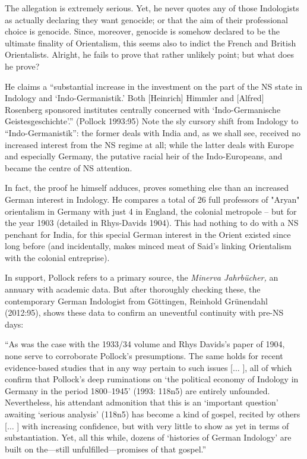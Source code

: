 The allegation is extremely serious. Yet, he never quotes any of those Indologists as actually declaring they want genocide; or that the aim of their professional choice is genocide. Since, moreover, genocide is somehow declared to be the ultimate finality of Orientalism, this seems also to indict the French and British Orientalists. Alright, he fails to prove that rather unlikely point; but what does he prove?

He claims a “substantial increase in the investment on the part of the NS state in Indology and ‘Indo-Germanistik.’ Both [Heinrich] Himmler and [Alfred] Rosenberg sponsored institutes centrally concerned with ‘Indo-Germanische Geistesgeschichte’.” (Pollock 1993:95) Note the sly cursory shift from Indology to “Indo-Germanistik”: the former deals with India and, as we shall see, received no increased interest from the NS regime at all; while the latter deals with Europe and especially Germany, the putative racial heir of the Indo-Europeans, and became the centre of NS attention. 
\newpage

In fact, the proof he himself adduces, proves something else than an increased German interest in Indology. He compares a total of 26 full professors of "Aryan" orientalism in Germany with just 4 in England, the colonial metropole – but for the year 1903 (detailed in Rhys-Davids 1904). This had nothing to do with a NS penchant for India, for this special German interest in the Orient existed since long before (and incidentally, makes minced meat of Said’s linking Orientalism with the colonial entreprise).

In support, Pollock refers to a primary source, the {\sl Minerva Jahrbücher,} an annuary with academic data. But after thoroughly checking these, the contemporary German Indologist from Göttingen, Reinhold Grünendahl (2012:95), shows these data to confirm an uneventful continuity with pre-NS days: 
\smallskip

\begin{myquote}
“As was the case with the 1933/34 volume and Rhys Davids’s paper of 1904, none serve to corroborate Pollock’s presumptions. The same holds for recent evidence-based studies that in any way pertain to such issues [$\ldots$ ], all of which confirm that Pollock’s deep ruminations on ‘the political economy of Indology in Germany in the period 1800–1945’ (1993: 118n5) are entirely unfounded. Nevertheless, his attendant admonition that this is an ‘important question’ awaiting ‘serious analysis’ (118n5) has become a kind of gospel, recited by others [$\ldots$ ] with increasing confidence, but with very little to show as yet in terms of substantiation. Yet, all this while, dozens of ‘histories of German Indology’ are built on the—still unfulfilled—promises of that gospel.”
\end{myquote}
\smallskip

